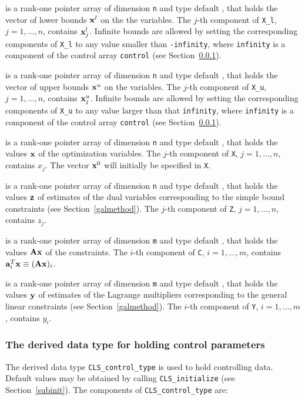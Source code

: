 \documentclass{galahad}
\newcommand{\packagename}{CLS}
\begin{document}
\begin{description}
 is a rank-one pointer array of dimension {\tt n} and type 
default \realdp, that holds
the vector of lower bounds ${\mathbf{x}}^{l}$ on the the variables.
The $j$-th component of {\tt X\_l}, $j = 1, \ldots , n$, 
contains ${\mathbf{x}}_{j}^{l}$.
Infinite bounds are allowed by setting the corresponding 
components of {\tt X\_l} to any value smaller than {\tt -infinity}, 
where {\tt infinity} is a component of the control array {\tt control} 
(see Section~\ref{typecontrol}).

 is a rank-one pointer array of dimension {\tt n} and type 
default \realdp, that holds
the vector of upper bounds ${\mathbf{x}}^{u}$ on the variables.
The $j$-th component of {\tt X\_u}, $j = 1, \ldots , n$, 
contains ${\mathbf{x}}_{j}^{u}$.
Infinite bounds are allowed by setting the corresponding 
components of {\tt X\_u} to any value larger than that {\tt infinity}, 
where {\tt infinity} is a component of the control array {\tt control} 
(see Section~\ref{typecontrol}).

 is a rank-one pointer array of dimension {\tt n} and type 
default \realdp, 
that holds the values ${\mathbf{x}}$ of the optimization variables.
The $j$-th component of {\tt X}, $j = 1,  \ldots , n$, contains $x_{j}$.  
The vector ${\mathbf{x}}^{0}$ will initially be specified in {\tt X}.

 is a rank-one pointer array of dimension {\tt n} and type default 
\realdp, that holds
the values ${\mathbf{z}}$ of estimates  of the dual variables 
corresponding to the simple bound constraints (see Section~\ref{galmethod}).
The $j$-th component of {\tt Z}, $j = 1,  \ldots ,  n$, contains $z_{j}$.  

 is a rank-one pointer array of dimension {\tt m} and type default 
\realdp, that holds
the values ${\mathbf{A}} {\mathbf{x}}$ of the constraints.
The $i$-th component of {\tt C}, $i = 1,  \ldots ,  m$, contains 
${\mathbf{a}}_{i}^{T}{\mathbf{x}} \equiv ({\mathbf{A}} {\mathbf{x}})_{i}$.  

 is a rank-one pointer array of dimension {\tt m} and type 
default \realdp, that holds
the values ${\mathbf{y}}$ of estimates  of the Lagrange multipliers
corresponding to the general linear constraints (see Section~\ref{galmethod}).
The $i$-th component of {\tt Y}, $i = 1,  \ldots ,  m$, contains $y_{i}$.  

\end{description}


\subsubsection{The derived data type for holding control 
 parameters}\label{typecontrol}
The derived data type 
{\tt \packagename\_control\_type} 
is used to hold controlling data. Default values may be obtained by calling 
{\tt \packagename\_initialize}
(see Section~\ref{subinit}). The components of 
{\tt \packagename\_control\_type} 
are:
\end{document}
